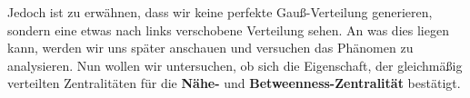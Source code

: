 \FloatBarrier
Jedoch ist zu erwähnen, dass wir keine perfekte Gauß-Verteilung generieren, sondern eine etwas nach links verschobene Verteilung sehen. An was dies liegen kann, werden wir uns später anschauen und versuchen das Phänomen zu analysieren. Nun wollen wir untersuchen, ob sich die Eigenschaft, der gleichmäßig verteilten Zentralitäten für die \textbf{Nähe-} und \textbf{Betweenness-Zentralität} bestätigt. 
